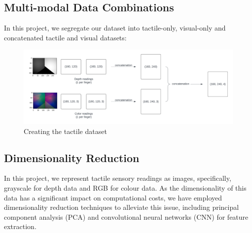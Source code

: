 \documentclass[11pt, a4paper]{report}
\begin{document}
\subsection{Multi-modal Data Combinations}
\label{sec:4.4.1}
In this project, we segregate our dataset into tactile-only, visual-only and concatenated tactile and visual datasets:
\begin{table}[H]
    \centering
    \caption{Dataset combinations}
    \label{tab:4.1}
\end{table}
\begin{figure}[H]
    \centering
    \includegraphics[width=\textwidth]{docs/Project Report/Media/tactile_dataset_creation.png}
    \caption{Creating the tactile dataset}
    \label{fig:my_label}
\end{figure}


\subsection{Dimensionality Reduction}
\label{sec:4.4.2}
In this project, we represent tactile sensory readings as images, specifically, grayscale for depth data and RGB for colour data. As the dimensionality of this data has a significant impact on computational costs, we have employed dimensionality reduction techniques to alleviate this issue, including principal component analysis (PCA) and convolutional neural networks (CNN) for feature extraction.
\end{document}

